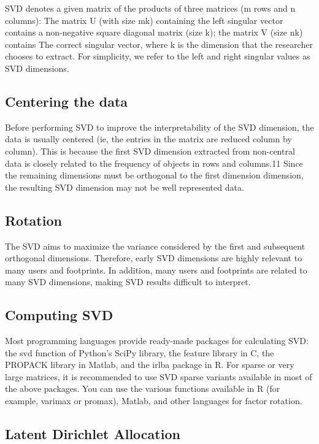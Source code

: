 SVD denotes a given matrix of the products of three matrices 
(m rows
 and n columns): The matrix U (with size mk) containing the left 
singular vector contains a non-negative square diagonal matrix 
(size k); the matrix V (size nk) contains The correct singular 
vector, where k is the dimension that the researcher chooses to 
extract. For simplicity, we refer to the left and right singular 
values as SVD dimensions.

\subsection{Centering the data}

Before performing SVD to improve the interpretability of the SVD 
dimension, the data is usually centered (ie, the entries in the 
matrix are reduced column by column). This is because the first SVD
 dimension extracted from non-central data is closely related to 
the frequency of objects in rows and columns.11 Since the remaining
 dimensions must be orthogonal to the first dimension dimension, 
the resulting SVD dimension may not be well represented data.

\subsection{Rotation}

The SVD aims to maximize the variance considered by the first and 
subsequent orthogonal dimensions. Therefore, early SVD dimensions 
are highly relevant to many users and footprints. In addition, many
 users and footprints are related to many SVD dimensions, making 
SVD results difficult to interpret.

\subsection{Computing SVD}

Most programming languages provide ready-made packages for 
calculating SVD: the svd function of Python's SciPy library, the 
feature library in C, the PROPACK library in Matlab, and the 
irlba package in R. For sparse or very large matrices, it is 
recommended to use SVD sparse variants available in most of the 
above packages. You can use the various functions available in R 
(for example, varimax or promax), Matlab, and other languages for 
factor rotation.

\subsection{Latent Dirichlet Allocation}

